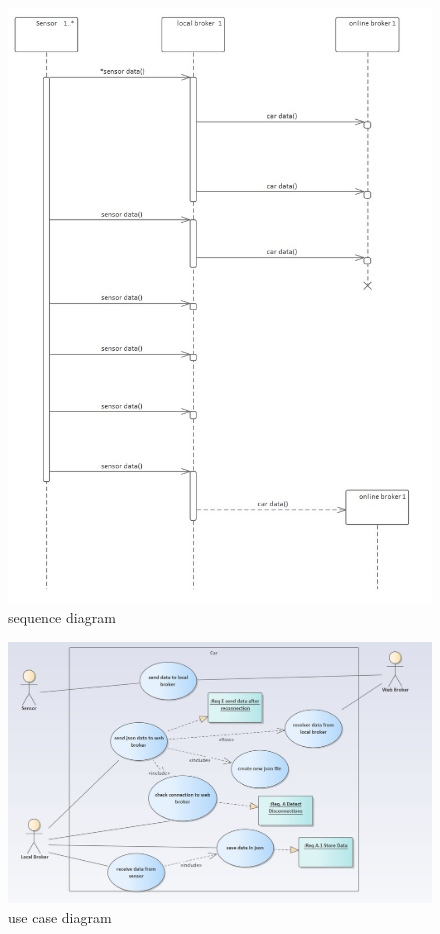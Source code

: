 \begin{figure}
\sidecaption
\includegraphics[scale=.5]{images/images_michael/sequence_diagram.jpg}
\caption{sequence diagram}
\label{fig:sequence}
\end{figure}
\begin{figure}
\sidecaption
\includegraphics[scale=.25]{images/images_michael/use_case_diagram.jpg}
\caption{use case diagram}
\label{fig:3}
\end{figure}


